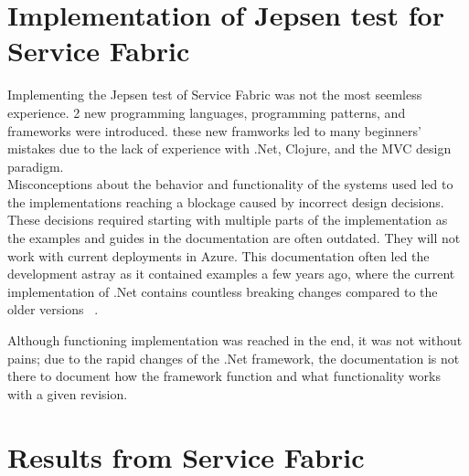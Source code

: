 \documentclass[a4paper,10pt,titlepage]{report}
\begin{document}
\section{Implementation of Jepsen test for Service Fabric}

Implementing the Jepsen test of Service Fabric was not the most seemless experience. 2 new programming languages, programming patterns, and frameworks were introduced. these new framworks led to many beginners' mistakes due to the lack of experience with .Net, Clojure, and the MVC design paradigm. 
\\ \vspace{5mm}
Misconceptions about the behavior and functionality of the systems used led to the implementations reaching a blockage caused by incorrect design decisions. These decisions required starting with multiple parts of the implementation as the examples and guides in the documentation are often outdated. They will not work with current deployments in Azure. This documentation often led the development astray as it contained examples a few years ago, where the current implementation of .Net contains countless breaking changes compared to the older versions~ \cite{breakingchangesdotnet}. 
\\ \vspace{5mm}

 Although functioning implementation was reached in the end, it was not without pains; due to the rapid changes of the .Net framework, the documentation is not there to document how the framework function and what functionality works with a given revision.

\section{Results from Service Fabric}
\end{document}
